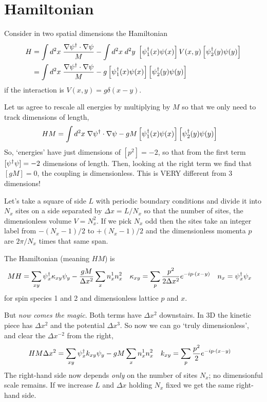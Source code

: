 \section{Hamiltonian}\label{sec:hamiltonian}

Consider in two spatial dimensions the Hamiltonian
\begin{align}
	H
	&= \int d^2x\; \frac{\nabla \psi{}^{\dagger} \cdot \nabla \psi}{M} - \int d^2x\; d^2y\; \left[\psi{}^{\dagger}_1(x) \psi(x)\right] V(x,y) \left[\psi{}^{\dagger}_2(y) \psi(y)\right]
	\\
	&= \int d^2x\; \frac{\nabla \psi{}^{\dagger} \cdot \nabla \psi}{M} - g \left[\psi{}^{\dagger}_1(x) \psi(x)\right] \left[\psi{}^{\dagger}_2(y) \psi(y)\right]
\end{align}
if the interaction is $V(x,y) = g \delta(x-y)$.

Let us agree to rescale all energies by multiplying by $M$ so that we only need to track dimensions of length,
\begin{align}
	HM
	&= \int d^2x\; \nabla \psi{}^{\dagger} \cdot \nabla \psi - gM \left[\psi{}^{\dagger}_1(x) \psi(x)\right] \left[\psi{}^{\dagger}_2(y) \psi(y)\right]
\end{align}
So, `energies' have just dimensions of $[p^2] = -2$, so that from the first term $[\psi{}^{\dagger}\psi] = -2$ dimensions of length.
Then, looking at the right term we find that $[gM] = 0$, the coupling is dimensionless.
This is VERY different from 3 dimensions!

Let's take a square of side $L$ with periodic boundary conditions and divide it into $N_x$ sites on a side separated by $\Delta x = L/N_x$ so that the number of sites, the dimensionless volume $V=N_x^2$.
If we pick $N_x$ odd then the sites take an integer label from $-(N_x-1)/2$ to $+(N_x-1)/2$ and the dimensionless momenta $p$ are $2\pi / N_x$ times that same span.

The Hamiltonian (meaning $HM$) is
\begin{align}
	MH &= \sum_{xy} \psi{}^{\dagger}_x \kappa_{xy} \psi_y - \frac{gM}{\Delta x^2} \sum_{x} n^1_x n^2_x
	&
	\kappa_{xy} &= \sum_{p} \frac{p^2}{2\Delta x^2} e^{-i p \cdot (x-y)}
	&
	n_x &= \psi{}^{\dagger}_x \psi_x
\end{align}
for spin species 1 and 2 and dimensionless lattice $p$ and $x$.

But \emph{now comes the magic}.
Both terms have $\Delta x^2$ downstairs.
In 3D the kinetic piece has $\Delta x^2$ and the potential $\Delta x^3$.
So now we can go `truly dimensionless', and clear the $\Delta x^{-2}$ from the right,
\begin{align}
	HM \Delta x^2
	&=
	\sum_{xy} \psi{}^{\dagger}_x k_{xy} \psi_y - gM \sum_x n^1_x n^2_x
	&
	k_{xy} &= \sum_{p} \frac{p^2}{2} e^{-i p \cdot (x-y)}
	\label{eq:hamiltonian}
\end{align}
The right-hand side now depends \emph{only} on the number of sites $N_x$; no dimensionful scale remains.
If we increase $L$ and $\Delta x$ holding $N_x$ fixed we get the same right-hand side.

